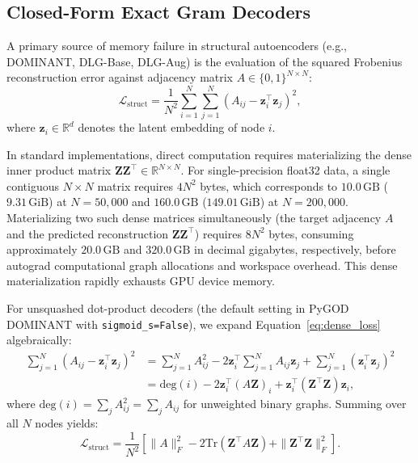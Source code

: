\documentclass[11pt,a4paper]{article}
\begin{document}
\subsection{Closed-Form Exact Gram Decoders}
A primary source of memory failure in structural autoencoders (e.g., DOMINANT, DLG-Base, DLG-Aug) is the evaluation of the squared Frobenius reconstruction error against adjacency matrix $A \in \{0, 1\}^{N \times N}$:
\begin{equation}
\mathcal{L}_{\mathrm{struct}} = \frac{1}{N^2} \sum_{i=1}^N \sum_{j=1}^N \left(A_{ij} - \mathbf{z}_i^\top \mathbf{z}_j\right)^2,
\label{eq:dense_loss}
\end{equation}
where $\mathbf{z}_i \in \mathbb{R}^d$ denotes the latent embedding of node $i$. 

In standard implementations, direct computation requires materializing the dense inner product matrix $\mathbf{Z} \mathbf{Z}^\top \in \mathbb{R}^{N \times N}$. For single-precision float32 data, a single contiguous $N \times N$ matrix requires $4 N^2$ bytes, which corresponds to $10.0\,\mathrm{GB}$ ($9.31\,\mathrm{GiB}$) at $N=50,000$ and $160.0\,\mathrm{GB}$ ($149.01\,\mathrm{GiB}$) at $N=200,000$. Materializing two such dense matrices simultaneously (the target adjacency $A$ and the predicted reconstruction $\mathbf{Z} \mathbf{Z}^\top$) requires $8 N^2$ bytes, consuming approximately $20.0\,\mathrm{GB}$ and $320.0\,\mathrm{GB}$ in decimal gigabytes, respectively, before autograd computational graph allocations and workspace overhead. This dense materialization rapidly exhausts GPU device memory.

For unsquashed dot-product decoders (the default setting in PyGOD DOMINANT with \texttt{sigmoid\_s=False}), we expand Equation~\eqref{eq:dense_loss} algebraically:
\begin{align}
\sum_{j=1}^N \left(A_{ij} - \mathbf{z}_i^\top \mathbf{z}_j\right)^2 &= \sum_{j=1}^N A_{ij}^2 - 2 \mathbf{z}_i^\top \sum_{j=1}^N A_{ij} \mathbf{z}_j + \sum_{j=1}^N (\mathbf{z}_i^\top \mathbf{z}_j)^2 \nonumber \\
&= \mathrm{deg}(i) - 2 \mathbf{z}_i^\top \left(A \mathbf{Z}\right)_i + \mathbf{z}_i^\top \left(\mathbf{Z}^\top \mathbf{Z}\right) \mathbf{z}_i,
\label{eq:gram_identity}
\end{align}
where $\mathrm{deg}(i) = \sum_j A_{ij}^2 = \sum_j A_{ij}$ for unweighted binary graphs. Summing over all $N$ nodes yields:
\begin{equation}
\mathcal{L}_{\mathrm{struct}} = \frac{1}{N^2} \left[ \|A\|_F^2 - 2 \mathrm{Tr}\left(\mathbf{Z}^\top A \mathbf{Z}\right) + \|\mathbf{Z}^\top \mathbf{Z}\|_F^2 \right].
\label{eq:exact_gram_loss}
\end{equation}
\end{document}
